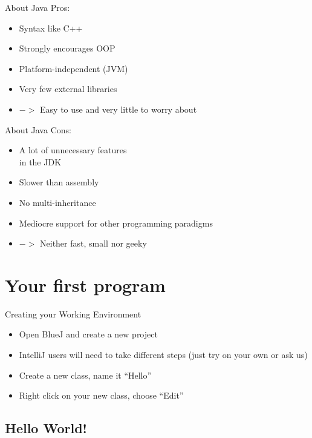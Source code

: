 \begin{frame}{About Java}
    Pros:
    \begin{itemize}
        \item Syntax like C++
        \item Strongly encourages OOP
        \item Platform-independent (JVM)
        \item Very few external libraries
        \item[] $->$ Easy to use and very little to worry about
    \end{itemize}
\end{frame}

\begin{frame}{About Java}
    Cons:
    \begin{itemize}
        \item A lot of unnecessary features \\ in the JDK
        \item Slower than assembly
        \item No multi-inheritance
        \item Mediocre support for other programming paradigms
        \item[] $->$ Neither fast, small nor geeky
    \end{itemize}
\end{frame}

\section{Your first program}
\begin{frame}[fragile]{Creating your Working Environment}
  \begin{itemize}
      \item Open BlueJ and create a new project\\
          \item IntelliJ users will need to take different steps (just try on your own or ask us)
      \item Create a new class, name it ``Hello''
      \item Right click on your new class, choose ``Edit''
  \end{itemize}
\end{frame}

\subsection{Hello World!}

